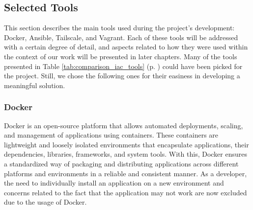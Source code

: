 \begin{table}[H]
  \caption{Comparison of Popular Infrastructure as Code Tools \cite{unleashing_full_potential_of_ansible_ref}.}
  \label{tab:comparison_iac_tools}
\end{table}

\subsection{Selected Tools} \label{sec:selected_tools}

This section describes the main tools used during the project's development: Docker, Ansible, Tailscale, and Vagrant. Each of these tools will be addressed with a certain degree of detail, and aspects related to how they were used within the context of our work will be presented in later chapters. Many of the tools presented in Table \ref{tab:comparison_iac_tools} (p. \pageref{tab:comparison_iac_tools}) could have been picked for the project. Still, we chose the following ones for their easiness in developing a meaningful solution.

\subsubsection{Docker} \label{sec:selected_tools_docker}

Docker is an open-source platform that allows automated deployments, scaling, and management of applications using containers. These containers are lightweight and loosely isolated environments that encapsulate applications, their dependencies, libraries, frameworks, and system tools. With this, Docker ensures a standardized way of packaging and distributing applications across different platforms and environments in a reliable and consistent manner. As a developer, the need to individually install an application on a new environment and concerns related to the fact that the application may not work are now excluded due to the usage of Docker. 


